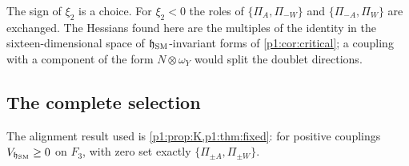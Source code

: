 The sign of $\xi_2$ is a choice. For $\xi_2<0$ the roles of $\{\Pi_A,\Pi_{-W}\}$ and $\{\Pi_{-A},\Pi_W\}$ are exchanged. The Hessians found here are the multiples of
the identity in the sixteen-dimensional space of $\mathfrak h_{\rm SM}$-invariant forms of \cref{p1:cor:critical}; a coupling with a component of the form
$N\otimes\omega_Y$ would split the doublet directions.

\subsection{The complete selection}
\label{p3:sec:selection}

The alignment result used is \cref{p1:prop:K,p1:thm:fixed}: for positive couplings $V_{\mathfrak h_{\rm SM}}\ge0$ on $F_3$, with zero set exactly $\{\Pi_{\pm A},\Pi_{\pm W}\}$.

